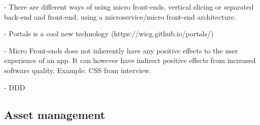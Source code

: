 - There are different ways of using micro front-ends, vertical slicing or separated back-end and front-end, using a microservice/micro front-end architecture.

- Portals is a cool new technology (https://wicg.github.io/portals/)

- Micro Front-ends does not inherently have any positive effects to the user experience of an app. It can however have indirect positive effects from increased software quality. Example: CSS from interview.

- DDD

\subsection{Asset management}